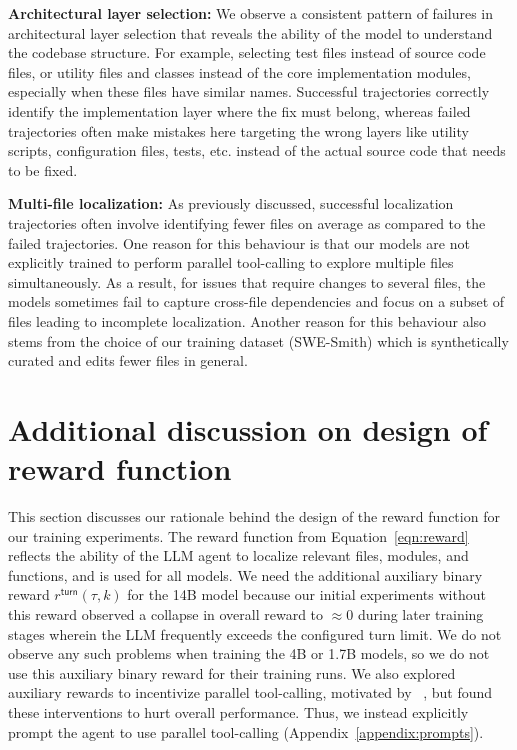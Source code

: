 \textbf{Architectural layer selection:} We observe a consistent pattern of failures in architectural layer selection that reveals the ability of the model to understand the codebase structure. For example, selecting test files instead of source code files, or utility files and classes instead of the core implementation modules, especially when these files have similar names. Successful trajectories correctly identify the implementation layer where the fix must belong, whereas failed trajectories often make mistakes here targeting the wrong layers like utility scripts, configuration files, tests, etc. instead of the actual source code that needs to be fixed.

\textbf{Multi-file localization:} As previously discussed, successful localization trajectories often involve identifying fewer files on average as compared to the failed trajectories. One reason for this behaviour is that our models are not explicitly trained to perform parallel tool-calling to explore multiple files simultaneously. As a result, for issues that require changes to several files, the models sometimes fail to capture cross-file dependencies and focus on a subset of files leading to incomplete localization. Another reason for this behaviour also stems from the choice of our training dataset (SWE-Smith) which is synthetically curated and edits fewer files in general.

\section{Additional discussion on design of reward function}\label{appendix:reward_function}
This section discusses our rationale behind the design of the reward function for our training experiments. The reward function from Equation~\ref{eqn:reward} reflects the ability of the LLM agent to localize relevant files, modules, and functions, and is used for all \methodname models. We need the additional auxiliary binary reward $r^{\mathsf{turn}}(\tau, k)$ for the 14B model because our initial experiments without this reward observed a collapse in overall reward to $\approx$0 during later training 
stages wherein the LLM frequently exceeds the configured turn limit. We do not observe any such problems when training the 4B or 1.7B models, so we do not use this auxiliary binary reward for their training runs. We also explored auxiliary rewards to incentivize parallel tool-calling, motivated by ~\citet{cognition2025swegrep}, but found these interventions to hurt overall performance. Thus, we instead explicitly prompt the agent to use parallel tool-calling (Appendix~\ref{appendix:prompts}). 

